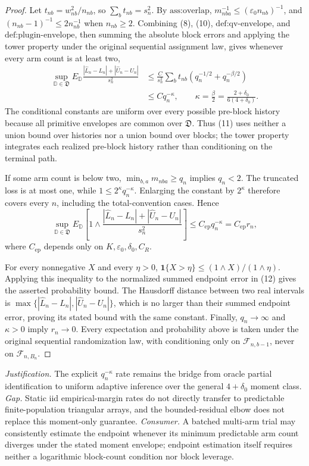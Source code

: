 \documentclass{article}
\begin{document}
\begin{proof}
Let \(t_{nb}=w_{nb}^2/n_{nb}\), so \(\sum_bt_{nb}=s_n^2\). By \(\text{ass:overlap}\), \(m_{nba}^{-1}\le(\varepsilon_0n_{nb})^{-1}\), and \((n_{nb}-1)^{-1}\le2n_{nb}^{-1}\) when \(n_{nb}\ge2\). Combining (8), (10), \(\text{def:qv-envelope}\), and \(\text{def:plugin-envelope}\), then summing the absolute block errors and applying the tower property under the original sequential assignment law, gives whenever every arm count is at least two,
\[
\begin{aligned}
\sup_{\mathbb D\in\mathfrak D}
E_{\mathbb D}\frac{|\widehat L_n-L_n|+|\widehat U_n-U_n|}{s_n^2}
&\le\frac{C}{s_n^2}\sum_bt_{nb}
\left(q_n^{-1/2}+q_n^{-\beta/2}\right)\\
&\le Cq_n^{-\kappa},
\qquad
\kappa=\frac\beta2=\frac{2+\delta_0}{6(4+\delta_0)}.
\end{aligned}
\tag{11}
\]
The conditional constants are uniform over every possible pre-block history because all primitive envelopes are common over \(\mathfrak D\). Thus (11) uses neither a union bound over histories nor a union bound over blocks; the tower property integrates each realized pre-block history rather than conditioning on the terminal path.

If some arm count is below two, \(\min_{b,a}m_{nba}\ge q_n\) implies \(q_n<2\). The truncated loss is at most one, while \(1\le2^\kappa q_n^{-\kappa}\). Enlarging the constant by \(2^\kappa\) therefore covers every \(n\), including the total-convention cases. Hence
\[
\sup_{\mathbb D\in\mathfrak D}E_{\mathbb D}\left[1\wedge
\frac{|\widehat L_n-L_n|+|\widehat U_n-U_n|}{s_n^2}\right]
\le C_{\mathrm{ep}}q_n^{-\kappa}=C_{\mathrm{ep}}r_n,
\tag{12}
\]
where \(C_{\mathrm{ep}}\) depends only on \(K,\varepsilon_0,\delta_0,C_R\).

For every nonnegative \(X\) and every \(\eta>0\),
\(\mathbf1\{X>\eta\}\le(1\wedge X)/(1\wedge\eta)\). Applying this inequality to the normalized summed endpoint error in (12) gives the asserted probability bound. The Hausdorff distance between two real intervals is
\(\max\{|\widehat L_n-L_n|,|\widehat U_n-U_n|\}\), which is no larger than their summed endpoint error, proving its stated bound with the same constant. Finally, \(q_n\to\infty\) and \(\kappa>0\) imply \(r_n\to0\). Every expectation and probability above is taken under the original sequential randomization law, with conditioning only on \(\mathcal F_{n,b-1}\), never on \(\mathcal F_{n,B_n}\).
\end{proof}
\par\smallskip\noindent \textit{Justification.} The explicit \(q_n^{-\kappa}\) rate remains the bridge from oracle partial identification to uniform adaptive inference over the general \(4+\delta_0\) moment class. \textit{Gap.} Static iid empirical-margin rates do not directly transfer to predictable finite-population triangular arrays, and the bounded-residual elbow does not replace this moment-only guarantee. \textit{Consumer.} A batched multi-arm trial may consistently estimate the endpoint whenever its minimum predictable arm count diverges under the stated moment envelope; endpoint estimation itself requires neither a logarithmic block-count condition nor block leverage.
\end{document}
